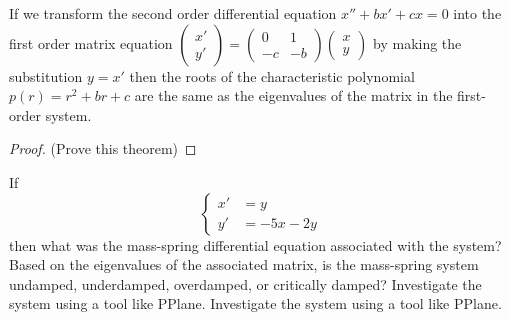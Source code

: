 \begin{thm}
    If we transform the second order differential equation $x'' + bx' + cx =0$ into the
    first order matrix equation $\begin{pmatrix} x' \\ y' \end{pmatrix} = \begin{pmatrix}
        0 & 1 \\ -c & -b \end{pmatrix} \begin{pmatrix} x \\ y \end{pmatrix}$ by making the
            substitution $y = x'$ then the roots of the characteristic polynomial $p(r) = r^2 +
            br + c$ are the same as the eigenvalues of the matrix in the first-order
            system.
\end{thm}
\begin{proof}
    (Prove this theorem)
\end{proof}




\begin{problem}   
    If 
    \[ \left\{ \begin{array}{cl} x' &= y \\ y' &= -5x-2y \end{array} \right. \]
    then what was the mass-spring differential equation associated with the system?  Based
    on the eigenvalues of the associated matrix, is the mass-spring system undamped,
    underdamped, overdamped, or critically damped? Investigate the system using a tool
    like PPlane. Investigate the system using a tool like PPlane.
\end{problem}


